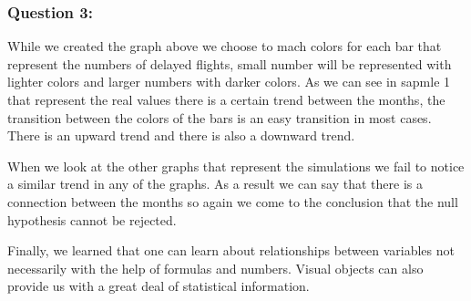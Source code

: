 \documentclass[
]{article}
\begin{document}
\hypertarget{question-3-1}{%
\subsubsection{Question 3:}\label{question-3-1}}

While we created the graph above we choose to mach colors for each bar
that represent the numbers of delayed flights, small number will be
represented with lighter colors and larger numbers with darker colors.
As we can see in sapmle 1 that represent the real values there is a
certain trend between the months, the transition between the colors of
the bars is an easy transition in most cases. There is an upward trend
and there is also a downward trend.

When we look at the other graphs that represent the simulations we fail
to notice a similar trend in any of the graphs. As a result we can say
that there is a connection between the months so again we come to the
conclusion that the null hypothesis cannot be rejected.

Finally, we learned that one can learn about relationships between
variables not necessarily with the help of formulas and numbers. Visual
objects can also provide us with a great deal of statistical
information.
\end{document}
